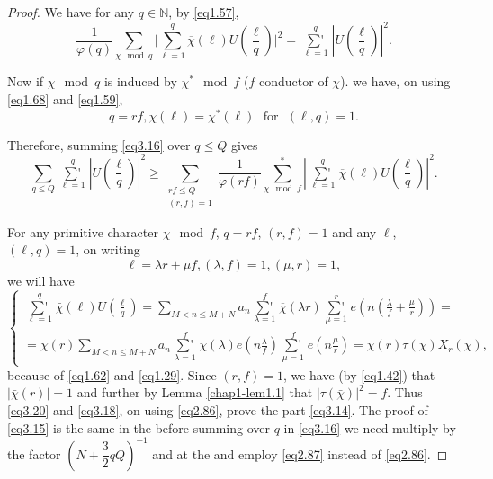 \begin{proof}%
We have for any $q \in \mathbb{N}$, by \eqref{eq1.57},
\begin{equation*}
\frac{1}{\varphi(q)} \sum_{\chi \mod q}\bigg|
\sum_{\ell=1}^{q}\overline{\chi}(\ell )U(\frac{\ell}{q})
\bigg|^{2}= \mathop{\sum{}'}\limits_{\ell =1}^{q}| U
(\frac{\ell}{q})|^2. \tag{3.16}\label{eq3.16} 
\end{equation*} 

Now if $\chi \mod q$ is induced by $\chi^* \mod f$ ($f$ conductor of
$\chi$). we have, on using \eqref{eq1.68} and \eqref{eq1.59}, 
\begin{equation*}
q = rf, \chi(\ell) = \chi^*(\ell) \text{~ for~ } (\ell, q) =
1. \tag{3.17}\label{eq3.17} 
\end{equation*}

Therefore, summing \eqref{eq3.16} over $q \leq Q$ gives
\begin{equation*}
\sum_{q \leq Q} \mathop{\sum{}'}\limits^{q}_{\ell =1}|U(\frac{\ell}{q})|^2 \geq
\sum_{\substack{rf \leq Q \\ (r,f) = 1}} \frac{1}{\varphi (rf)}
\sum_{\chi \mod f}^*|
    \mathop{\sum{}'}\limits_{\ell=1}^{q} \overline{\chi}(\ell) 
U(\frac{\ell}{q})|^2. \tag{3.18}\label{eq3.18}   
\end{equation*}


For any primitive character $\chi \mod f$, $q=rf$, $(r,f)=1$ and any
$\ell$, $(\ell,q)=1$, on writing 
\begin{equation*}
\ell = \lambda r + \mu f, (\lambda,f) = 1, (\mu ,r) = 1,
\tag{3.19}\label{eq3.19}
\end{equation*}\pageoriginale
we will have
\begin{equation*} 
\begin{cases}
\mathop{\sum{}'}\limits_{\ell =1}^q \bar{\chi} (\ell) U (\frac{\ell}{q})  =
\sum\limits_{M < n \leq M+N}  a_n \mathop{\sum{}'}\limits_{\lambda = 1}^f
\overline{\chi}(\lambda r) \mathop{\sum{}'}\limits_{\mu = 1}^r  e(n
(\frac{\lambda}{f} + \frac{\mu}{r})) = \\ 
=\bar{\chi}(r) \sum\limits_{M < n \leq M+N} a_n
\mathop{\sum{}'}\limits^{f}_{\lambda = 
  1} \bar{\chi}(\lambda)e(n \frac{\lambda}{f})
\mathop{\sum{}'}\limits^{f}_{\mu = 1} 
e(n \frac{\mu}{r}) = \bar{\chi} (r) \tau (\bar{\chi}) X_r (\chi),  
\end{cases}\tag{3.20} \label{eq3.20}
\end{equation*}
because of \eqref{eq1.62} and \eqref{eq1.29}. Since $(r,f) = 1$, we
have (by \eqref{eq1.42}) that $|\bar{\chi}(r)| = 1$ and further by
Lemma \ref{chap1-lem1.1} that $|\tau(\bar{\chi})|^2 =  f$. Thus
\eqref{eq3.20} and \eqref{eq3.18}, on using \eqref{eq2.86}, prove the
part \eqref{eq3.14}. The proof of \eqref{eq3.15} is the same in the
before summing over $q$ in \eqref{eq3.16} we need multiply by the
factor $(N+\dfrac{3}{2} q Q)^{-1}$ and at the and employ
\eqref{eq2.87} instead of \eqref{eq2.86}. 


\end{proof}
